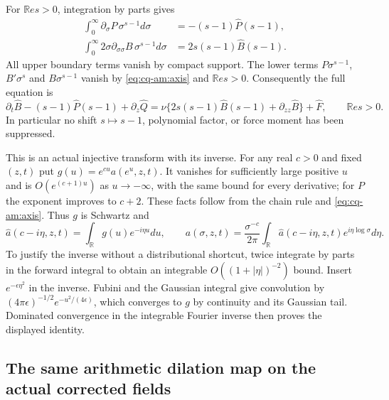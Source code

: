 For $\mathbb Re s>0$, integration by parts gives
\begin{align*}
 \int_0^\infty\partial_\sigma P\,\sigma^{s-1}d\sigma
    &=-(s-1)\widehat P(s-1),\\
 \int_0^\infty 2\sigma\partial_{\sigma\sigma}B\,
                       \sigma^{s-1}d\sigma
    &=2s(s-1)\widehat B(s-1).
\end{align*}
All upper boundary terms vanish by compact support. The lower terms
$P\sigma^{s-1}$, $B'\sigma^s$ and $B\sigma^{s-1}$ vanish by
\eqref{eq:cq-am:axis} and $\mathbb Re s>0$. Consequently the full equation is
\begin{equation}
 \partial_t\widehat B-(s-1)\widehat P(s-1)+\partial_z\widehat Q
 =\nu\{2s(s-1)\widehat B(s-1)+\partial_{zz}\widehat B\}
       +\widehat F,\qquad\mathbb Re s>0.
 \label{eq:cq-am:mellin}
\end{equation}
In particular no shift $s\mapsto s-1$, polynomial factor, or force
moment has been suppressed.

This is an actual injective transform with its inverse. For any real
$c>0$ and fixed $(z,t)$ put $g(u)=e^{cu}a(e^u,z,t)$.
It vanishes for sufficiently large positive $u$ and is
$O(e^{(c+1)u})$ as $u\to-\infty$, with the same bound for every
derivative; for $P$ the exponent improves to $c+2$.
These facts follow from the chain rule and \eqref{eq:cq-am:axis}.
Thus $g$ is Schwartz and
\[
 \widehat a(c-i\eta,z,t)=\int_\mathbb R g(u)e^{-i\eta u}du,
 \qquad
 a(\sigma,z,t)=\frac{\sigma^{-c}}{2\pi}\int_\mathbb R
          \widehat a(c-i\eta,z,t)e^{i\eta\log\sigma}d\eta.
\]
To justify the inverse without a distributional shortcut, twice
integrate by parts in the forward integral to obtain an integrable
$O((1+|\eta|)^{-2})$ bound. Insert $e^{-\epsilon\eta^2}$ in the
inverse. Fubini and the Gaussian integral give convolution by
$(4\pi\epsilon)^{-1/2}e^{-u^2/(4\epsilon)}$, which converges to
$g$ by continuity and its Gaussian tail. Dominated convergence in
the integrable Fourier inverse then proves the displayed identity.

\subsection{The same arithmetic dilation map on the actual corrected fields}


